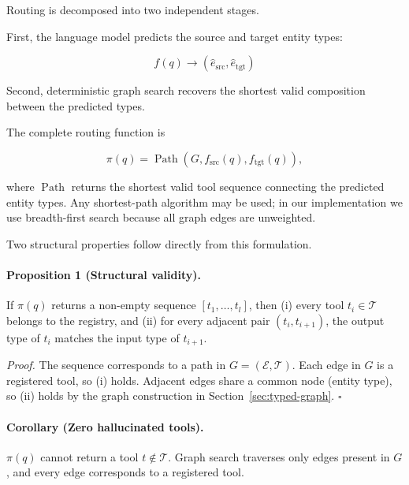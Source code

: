 Routing is decomposed into two independent stages.

First, the language model predicts the source and target entity types:

\begin{equation}
    f(q)
    \rightarrow
    (\hat e_{\mathrm{src}},
     \hat e_{\mathrm{tgt}})
    \label{eq:type-prediction}
\end{equation}

Second, deterministic graph search recovers the shortest valid composition between the predicted types.

The complete routing function is

\begin{equation}
    \pi(q)
    =
    \operatorname{Path}
    \left(
        G,
        f_{\mathrm{src}}(q),
        f_{\mathrm{tgt}}(q)
    \right),
    \label{eq:routing-function}
\end{equation}

where $\operatorname{Path}$ returns the shortest valid tool sequence connecting the predicted entity types.
Any shortest-path algorithm may be used; in our implementation we use breadth-first search because all graph edges are unweighted.

Two structural properties follow directly from this formulation.

\paragraph{Proposition 1 (Structural validity).}
If $\pi(q)$ returns a non-empty sequence $[t_1, \ldots, t_l]$, then (i) every tool $t_i \in \mathcal{T}$ belongs to the registry, and (ii) for every adjacent pair $(t_i, t_{i+1})$, the output type of $t_i$ matches the input type of $t_{i+1}$.

\emph{Proof.}
The sequence corresponds to a path in $G = (\mathcal{E}, \mathcal{T})$.
Each edge in $G$ is a registered tool, so (i) holds.
Adjacent edges share a common node (entity type), so (ii) holds by the graph construction in Section~\ref{sec:typed-graph}. \hfill $\square$

\paragraph{Corollary (Zero hallucinated tools).}
$\pi(q)$ cannot return a tool $t \notin \mathcal{T}$.
Graph search traverses only edges present in $G$, and every edge corresponds to a registered tool.

